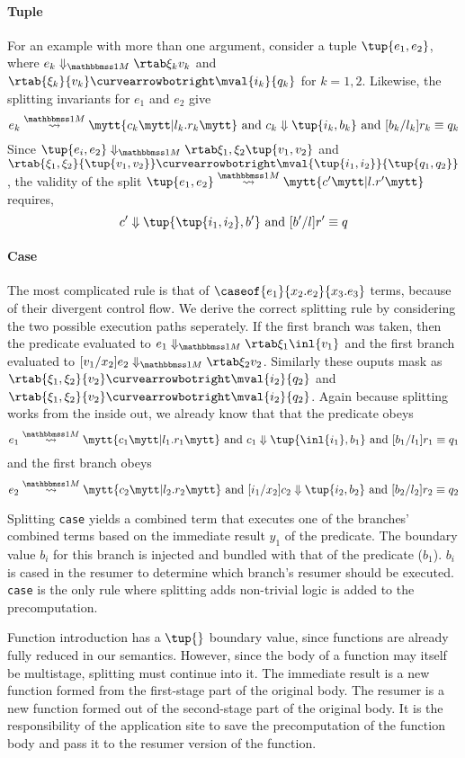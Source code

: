 \begin{abstrsyn}
\paragraph{Tuple} 
For an example with more than one argument, consider a tuple $\tup{e_1,e_2}$,
where $\diaone {e_k} {\xi_k} {v_k}$ and $\rtab {\xi_k} {v_k} \vsplito \mval {i_k} {q_k}$
for $k = 1,2$.
Likewise, the splitting invariants for $e_1$ and $e_2$ give
\[
	\splitone {e_k} A {c_k} {l_k.r_k} \text{ and } \reduce {c_k} {\tup{i_k,b_k}} \text{ and } [b_k/l_k]r_k \equiv q_k
\]
Since $\diaone {\tup{e_i,e_2}} {\xi_1,\xi_2} {\tup{v_1,v_2}}$ 
and $\rtab {\xi_1,\xi_2} {\tup{v_1,v_2}} \vsplito \mval {\tup{i_1,i_2}} {\tup{q_1,q_2}}$,
the validity of the split $\splitone {\tup{e_1,e_2}} A {c'} {l.r'}$ requires,
\[
	\reduce {c'} {\tup{\tup{i_1,i_2},b'}} \text{ and } [b'/l]r' \equiv q
\]

\paragraph {Case}
The most complicated rule is that of $\caseof {e_1} {x_2.e_2} {x_3.e_3}$ terms, because of their divergent control flow.
We derive the correct splitting rule by considering the two possible execution paths seperately.
If the first branch was taken, then the predicate evaluated to $\diaone {e_1} {\xi_1} {\inl {v_1}}$ 
and the first branch evaluated to $\diaone {[v_1/x_2]e_2} {\xi_2} {v_2}$.
Similarly these ouputs mask as $\rtab {\xi_1,\xi _2} {v_2} \vsplito \mval {i_2} {q_2}$ and $\rtab {\xi_1,\xi _2} {v_2} \vsplito \mval {i_2} {q_2}$.
Again because splitting works from the inside out, we already know that that the predicate obeys
\[
	\splitone {e_1} A {c_1} {l_1.r_1} \text{ and } \reduce {c_1} {\tup{\inl {i_1},b_1}} \text{ and } [b_1/l_1]r_1 \equiv q_1
\]
and the first branch obeys
\[
	\splitone {e_2} A {c_2} {l_2.r_2} \text{ and } \reduce {[i_1/x_2]c_2} {\tup{i_2,b_2}} \text{ and } [b_2/l_2]r_2 \equiv q_2
\]

Splitting {\tt case} yields a combined term that executes one of the branches' combined terms based on the immediate result $y_1$ of the predicate.
The boundary value $b_i$ for this branch is injected and bundled with that of the predicate ($b_1$). 
$b_i$ is cased in the resumer to determine which branch's resumer should be executed.
{\tt case} is the only rule where splitting adds non-trivial logic is added to the precomputation.

Function introduction has a $\tup{}$ boundary value,
since functions are already fully reduced in our semantics.
However, since the body of a function may itself be multistage, splitting must continue into it.
The immediate result is a new function formed from the first-stage part of the original body.
The resumer is a new function formed out of the second-stage part of the original body.
It is the responsibility of the application site to save the precomputation of the function body
and pass it to the resumer version of the function.


\end{abstrsyn}
